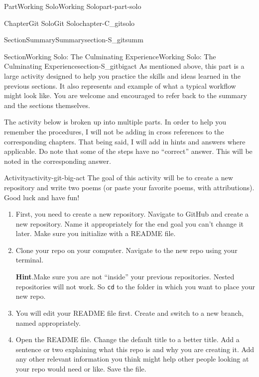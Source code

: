 \documentclass[oneside,10pt,]{book}
\newcommand{\blocktitlefont}{\relax}
\newcommand{\mono}[1]{\texttt{#1}}
\begin{document}
\begin{partptx}{Part}{Working Solo}{}{Working Solo}{}{}{part-part-solo}
\begin{chapterptx}{Chapter}{Git Solo}{}{Git Solo}{}{}{chapter-C_gitsolo}
\begin{sectionptx}{Section}{Summary}{}{Summary}{}{}{section-S_gitsumm}
%
\end{sectionptx}
%
%
\typeout{************************************************}
\typeout{************************************************}
%
\begin{sectionptx}{Section}{Working Solo: The Culminating Experience}{}{Working Solo: The Culminating Experience}{}{}{section-S_gitbigact}
%
As mentioned above, this part is a large activity designed to help you practice the skills and ideas learned in the previous sections. It also represents and example of what a typical workflow might look like. You are welcome and encouraged to refer back to the summary and the sections themselves.%
\par
The activity below is broken up into multiple parts. In order to help you remember the procedures, I will not be adding in cross references to the corresponding chapters. That being said, I will add in hints and answers where applicable. Do note that some of the steps have no ``correct'' answer. This will be noted in the corresponding answer.%
\begin{activity}{Activity}{}{activity-git-big-act}%
The goal of this activity will be to create a new repository and write two poems (or paste your favorite poems, with attributions). Good luck and have fun!%
\begin{enumerate}[font=\bfseries,label=(\alph*),ref=\alph*]%
\item\label{task-git-ba-newrepo}First, you need to create a new repository. Navigate to GitHub and create a new repository. Name it appropriately for the end goal \textemdash{} you can't change it later. Make sure you initialize with a README file.%
\item\label{task-git-ba-clone}Clone your repo on your computer. Navigate to the new repo using your terminal.%
\par\smallskip%
\noindent\textbf{\blocktitlefont Hint}.\hypertarget{hint-git-ba-clone-b}{}\quad{}Make sure you are not ``inside'' your previous repositories. Nested repositories will not work. So \mono{cd} to the folder in which you want to place your new repo.%
\item{}You will edit your README file first. Create and switch to a new branch, named appropriately.%
\item{}Open the README file. Change the default title to a better title. Add a sentence or two explaining what this repo is and why you are creating it. Add any other relevant information you think might help other people looking at your repo would need or like. Save the file.%

\end{enumerate}
\end{activity}
\end{sectionptx}
\end{chapterptx}
\end{partptx}
\end{document}
